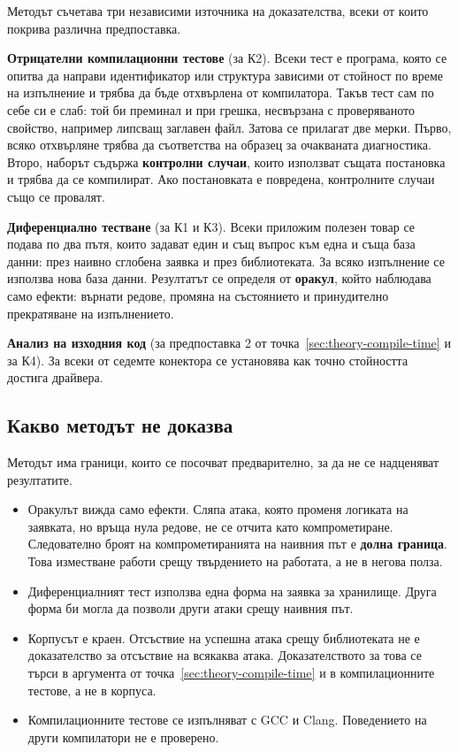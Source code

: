 Методът съчетава три независими източника на доказателства, всеки от които
покрива различна предпоставка.

\textbf{Отрицателни компилационни тестове} (за К2). Всеки тест е програма, която
се опитва да направи идентификатор или структура зависими от стойност по време на
изпълнение и трябва да бъде отхвърлена от компилатора. Такъв тест сам по себе си
е слаб: той би преминал и при грешка, несвързана с проверяваното свойство,
например липсващ заглавен файл. Затова се прилагат две мерки. Първо, всяко
отхвърляне трябва да съответства на образец за очакваната диагностика. Второ,
наборът съдържа \textbf{контролни случаи}, които използват същата постановка и
трябва да се компилират. Ако постановката е повредена, контролните случаи също
се провалят.

\textbf{Диференциално тестване} (за К1 и К3). Всеки приложим полезен товар се
подава по два пътя, които задават един и същ въпрос към една и съща база данни:
през наивно сглобена заявка и през библиотеката. За всяко изпълнение се използва
нова база данни. Резултатът се определя от \textbf{оракул}, който наблюдава само
ефекти: върнати редове, промяна на състоянието и принудително прекратяване на
изпълнението.

\textbf{Анализ на изходния код} (за предпоставка 2 от
точка~\ref{sec:theory-compile-time} и за К4). За всеки от седемте конектора се
установява как точно стойността достига драйвера.

\subsection{Какво методът не доказва}
\label{sec:tm-not-proven}

Методът има граници, които се посочват предварително, за да не се надценяват
резултатите.

\begin{itemize}
    \item Оракулът вижда само ефекти. Сляпа атака, която променя логиката на
          заявката, но връща нула редове, не се отчита като компрометиране.
          Следователно броят на компрометиранията на наивния път е \textbf{долна
          граница}. Това изместване работи срещу твърдението на работата, а не в
          негова полза.
    \item Диференциалният тест използва една форма на заявка за хранилище. Друга форма би
          могла да позволи други атаки срещу наивния път.
    \item Корпусът е краен. Отсъствие на успешна атака срещу библиотеката не е
          доказателство за отсъствие на всякаква атака. Доказателството за това се
          търси в аргумента от точка~\ref{sec:theory-compile-time} и в
          компилационните тестове, а не в корпуса.
    \item Компилационните тестове се изпълняват с GCC и Clang. Поведението на
          други компилатори не е проверено.
\end{itemize}

